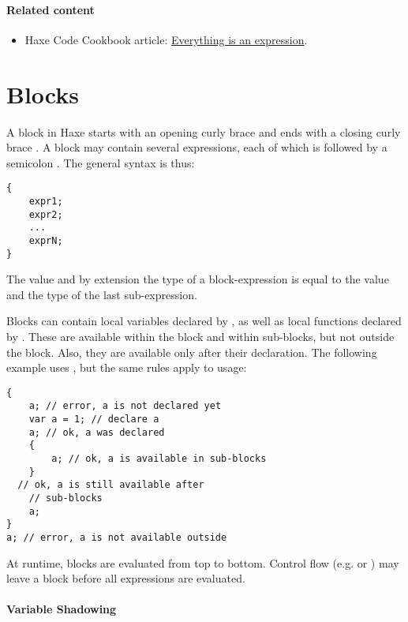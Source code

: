 \paragraph{Related content}
\begin{itemize}
	\item Haxe Code Cookbook  article: \href{http://code.haxe.org/category/principles/everything-is-an-expression.html}{Everything is an expression}.
\end{itemize}


\section{Blocks}
\label{expression-block}

A block in Haxe starts with an opening curly brace \expr{\{} and ends with a closing curly brace \expr{\}}. A block may contain several expressions, each of which is followed by a semicolon \expr{;}. The general syntax is thus:

\begin{lstlisting}
{
	expr1;
	expr2;
	...
	exprN;
}
\end{lstlisting}
The value and by extension the type of a block-expression is equal to the value and the type of the last sub-expression.

Blocks can contain local variables declared by , as well as local functions declared by . These are available within the block and within sub-blocks, but not outside the block. Also, they are available only after their declaration. The following example uses , but the same rules apply to  usage:

\begin{lstlisting}
{
	a; // error, a is not declared yet
	var a = 1; // declare a
	a; // ok, a was declared
	{
		a; // ok, a is available in sub-blocks
	}
  // ok, a is still available after
	// sub-blocks	
	a;
}
a; // error, a is not available outside
\end{lstlisting}
At runtime, blocks are evaluated from top to bottom. Control flow (e.g.  or ) may leave a block before all expressions
are evaluated.

\paragraph{Variable Shadowing}


